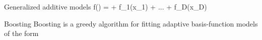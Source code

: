                                   Generalized additive models
                                  f() = \alpha + f_1(x_1) + ... + f_D(x_D)                                  


Boosting
  Boosting is a greedy algorithm for fitting adaptive basis-function models of the form 
  
  
  
  
  



